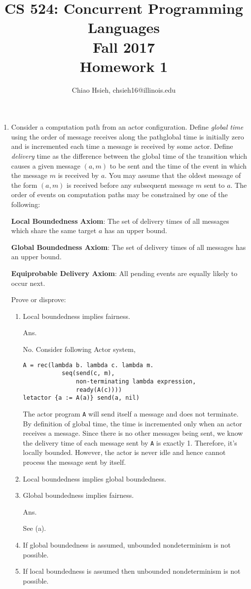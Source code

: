 \documentclass{article}
\title{\Large\bfseries
CS 524: Concurrent Programming Languages \\
Fall 2017 \\
Homework 1}
\author{Chiao Hsieh, chsieh16@illinois.edu}
\begin{document}
\maketitle


\begin{enumerate}
\item Consider a computation path from an actor configuration.
Define \textit{global time} using the order of message receives along the
path\textemdash global time is initially zero and is incremented each time a
message is received by some actor.
Define \textit{delivery} time as the difference between the global time of the
transition which causes a given message $(a, m)$ to be sent and the time of 
the event in which the message $m$ is received by $a$.
You may assume that the oldest message of the form $(a, m)$ is received before
any subsequent message $m$ sent to $a$.
The order of events on computation paths may be constrained by one of the 
following:

\textbf{Local Boundedness Axiom}: 
The set of delivery times of all messages which share the same target $a$ has 
an upper bound.

\textbf{Global Boundedness Axiom}:
The set of delivery times of all messages has an upper bound.

\textbf{Equiprobable Delivery Axiom}:
All pending events are equally likely to occur next.

Prove or disprove:
\begin{enumerate}
\item Local boundedness implies fairness.

Ans.

No. Consider following Actor system,
\begin{verbatim}
A = rec(lambda b. lambda c. lambda m.
           seq(send(c, m),
               non-terminating lambda expression,
               ready(A(c))))
letactor {a := A(a)} send(a, nil)
\end{verbatim}
The actor program \texttt{A} will send itself a message and does not
terminate. By definition of global time, the time is incremented only when an
actor receives a message. Since there is no other messages being sent, we
know the delivery time of each message sent by \texttt{A} is exactly 1. 
Therefore, it's locally bounded. However, the actor is never idle and hence 
cannot process the message sent by itself.

\item Local boundedness implies global boundedness.

\item Global boundedness implies fairness.

Ans.

See (a).

\item If global boundedness is assumed, unbounded nondeterminism is not 
possible.

\item If local boundedness is assumed then unbounded nondeterminism is not 
possible.

\end{enumerate}
\end{enumerate}
\end{document}
